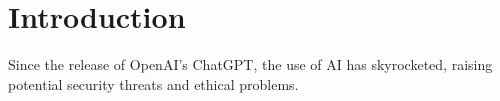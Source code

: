 \chapter{Introduction}


Since the release of OpenAI's ChatGPT, the use of AI has skyrocketed, raising potential security threats and ethical problems.


